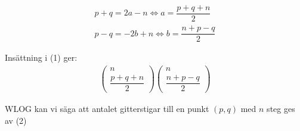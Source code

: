 \documentclass{tufte-handout}
\def\Lrarr{\Leftrightarrow}
\begin{document}
\begin{ans}
  \begin{equation*}
    \begin{gathered}
      p+q = 2a-n\Lrarr a = \dfrac{p+q+n}{2}\\
      p-q = -2b+n\Lrarr b = \dfrac{n+p-q}{2}
    \end{gathered}
  \end{equation*}
  \par\bigskip
  \noindent Insättning i (1) ger:
  \begin{equation}
    \begin{gathered}
      \begin{pmatrix}n\\\dfrac{p+q+n}{2}\end{pmatrix}\begin{pmatrix}n\\\dfrac{n+p-q}{2}\end{pmatrix}
    \end{gathered}
  \end{equation}
  \par\bigskip
  \noindent WLOG kan vi säga att antalet gitterstigar till en punkt $(p,q)$ med $n$ steg ges av (2)
\end{ans}
\end{document}
